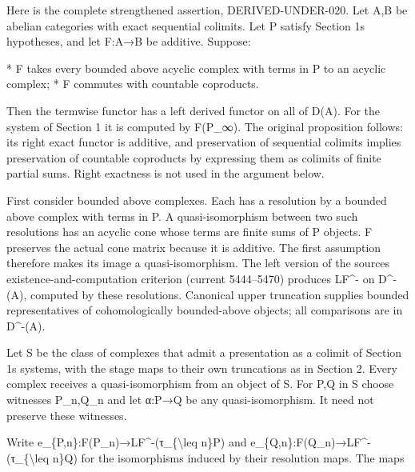\documentclass[11pt]{article}
\begin{document}
Here is the complete strengthened assertion,\allowbreak{} DERIVED-UNDER-020. Let A,\allowbreak{}B be abelian categories with exact sequential colimits. Let P satisfy Section 1\textquotesingle s hypotheses,\allowbreak{} and let F:\allowbreak{}A\allowbreak{}→B be additive. Suppose:\allowbreak{}

* F takes every bounded above acyclic complex with terms in P to an acyclic complex; * F commutes with countable coproducts.

Then the termwise functor has a left derived functor on all of D(A)\allowbreak{}. For the system of Section 1 it is computed by F(P\_\allowbreak{}∞)\allowbreak{}. The original proposition follows:\allowbreak{} its right exact functor is additive,\allowbreak{} and preservation of sequential colimits implies preservation of countable coproducts by expressing them as colimits of finite partial sums. Right exactness is not used in the argument below.

First consider bounded above complexes. Each has a resolution by a bounded above complex with terms in P. A quasi-isomorphism between two such resolutions has an acyclic cone whose terms are finite sums of P objects. F preserves the actual cone matrix because it is additive. The first assumption therefore makes its image a quasi-isomorphism. The left version of the source\textquotesingle s existence-and-computation criterion (current 5444–\allowbreak{}5470)\allowbreak{} produces LF\^{}- on D\textasciicircum{}-(A)\allowbreak{},\allowbreak{} computed by these resolutions. Canonical upper truncation supplies bounded representatives of cohomologically bounded-above objects; all comparisons are in D\textasciicircum{}-(A)\allowbreak{}.

Let S be the class of complexes that admit a presentation as a colimit of Section 1\textquotesingle s systems,\allowbreak{} with the stage maps to their own truncations as in Section 2. Every complex receives a quasi-isomorphism from an object of S. For P,\allowbreak{}Q in S choose witnesses P\_\allowbreak{}n,\allowbreak{}Q\_\allowbreak{}n and let α:\allowbreak{}P\allowbreak{}→Q be any quasi-isomorphism. It need not preserve these witnesses.

Write e\_\allowbreak{}\{P,\allowbreak{}n\}:\allowbreak{}F(P\_\allowbreak{}n)\allowbreak{}\allowbreak{}→LF\textasciicircum{}-(τ\_\allowbreak{}\{\textbackslash{}leq n\}P)\allowbreak{} and e\_\allowbreak{}\{Q,\allowbreak{}n\}:\allowbreak{}F(Q\_\allowbreak{}n)\allowbreak{}\allowbreak{}→LF\textasciicircum{}-(τ\_\allowbreak{}\{\textbackslash{}leq n\}Q)\allowbreak{} for the isomorphisms induced by their resolution maps. The maps
\end{document}
